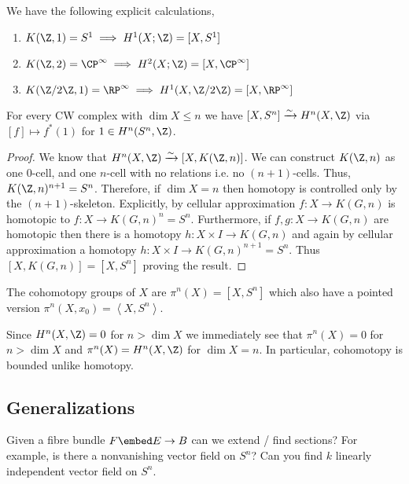 \documentclass[12pt]{extarticle}
\begin{document}
\begin{ex}
We have the following explicit calculations,
\begin{enumerate}
\item $K(\Z, 1) = S^1 \implies H^1(X; \Z) = [X, S^1]$
\item $K(\Z, 2) = \CP^\infty \implies H^2(X; \Z) = [X, \CP^\infty]$
\item $K(\Z/2 \Z, 1) = \RP^\infty \implies H^1(X, \Z / 2 \Z) = [X, \RP^\infty]$
\end{enumerate}
\end{ex}

\begin{thm}[Hopf]
For every CW complex with $\dim{X} \le n$ we have $[X, S^n] \xrightarrow{\sim} H^n(X, \Z)$ via $[f] \mapsto f^*(1)$ for $1 \in H^n(S^n, \Z)$. 
\end{thm}

\begin{proof}
We know that $H^n(X, \Z) \xrightarrow{\sim} [X, K(\Z, n)]$. We can construct $K(\Z, n)$ as one $0$-cell, and one $n$-cell with no relations i.e. no $(n+1)$-cells. Thus, $K(\Z, n)^{n+1} = S^n$. Therefore, if $\dim{X} = n$ then homotopy is controlled only by the $(n+1)$-skeleton. Explicitly, by cellular approximation $f : X \to K(G, n)$ is homotopic to $f : X \to K(G, n)^{n} = S^n$. Furthermore, if $f, g : X \to K(G, n)$ are homotopic then there is a homotopy $h : X \times I \to K(G, n)$ and again by cellular approximation a homotopy $h : X \times I \to K(G, n)^{n+1} = S^n$. Thus $[X, K(G, n)] = [X, S^n]$ proving the result. 
\end{proof}

\begin{definition}
The cohomotopy groups of $X$ are $\pi^n(X) = [X, S^n]$ which also have a pointed version $\pi^n(X, x_0) = \left< X, S^n \right>$. 
\end{definition}

\begin{rmk}
Since $H^n(X, \Z) = 0$ for $n > \dim{X}$ we immediately see that $\pi^n(X) = 0$ for $n > \dim{X}$ and $\pi^n(X) = H^n(X, \Z)$ for $\dim{X} = n$. In particular, cohomotopy is bounded unlike homotopy. 
\end{rmk}

\subsection{Generalizations}

\begin{rmk}
Given a fibre bundle $F \embed E \to B$ can we extend / find sections? For example, is there a nonvanishing vector field on $S^n$? Can you find $k$ linearly independent vector field on $S^n$. 
\end{rmk}
\end{document}
